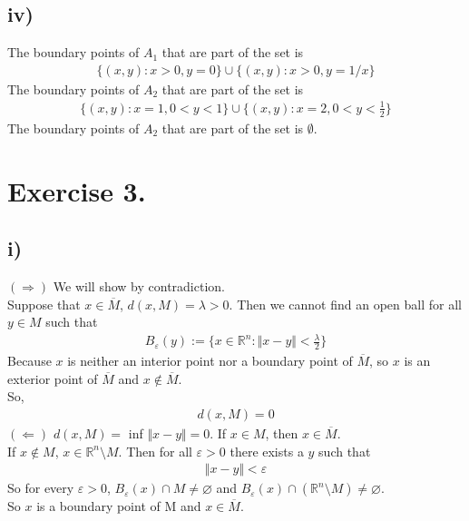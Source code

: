 \documentclass{article}
\begin{document}
\subsection*{iv)}
The boundary points of $A_1$ that are part of the set is
\begin{align*}
\lbrace(x,y):x>0,y=0\rbrace\cup\lbrace(x,y):x>0,y=1/x\rbrace
\end{align*}
The boundary points of $A_2$ that are part of the set is
\begin{align*}
\lbrace(x,y):x=1,0<y<1\rbrace\cup\lbrace(x,y):x=2,0<y<\frac{1}{2}\rbrace
\end{align*}
The boundary points of $A_2$ that are part of the set is $\emptyset$.

\section*{Exercise 3.}
\subsection*{i)}
$(\Rightarrow)$ We will show by contradiction.\\ Suppose that $x \in \overline{M}$, $d(x,M)=\lambda>0$. Then we cannot find an open ball for all $y\in M$ such that
\begin{align*}
B_\varepsilon(y):=\lbrace x\in \mathbb{R}^n:\Vert x-y\Vert<\frac{\lambda}{2}\rbrace
\end{align*}
Because $x$ is neither an interior point nor a boundary point of $\overline{M}$, so $x$ is an exterior point of $\overline{M}$ and $x\not\in \overline{M}$.\\
So, 
\begin{align*}
d(x,M)=0
\end{align*}
$(\Leftarrow)$ $d(x,M)=$ inf $\Vert x-y\Vert=0$. If $x\in M$, then $x\in \overline{M}$.\\
If $x\not\in M$, $x\in \mathbb{R}^n \setminus M $. Then for all $\varepsilon>0$ there exists a $y$ such that
\begin{align*}
\Vert x-y\Vert<\varepsilon
\end{align*}
So for every $\varepsilon>0$, $B_\varepsilon(x)\cap M\not= \varnothing$ and $B_\varepsilon(x)\cap (\mathbb{R}^n \setminus M)\not= \varnothing$.\\
So $x$ is a boundary point of M and $x\in \overline{M}$.
\end{document}
